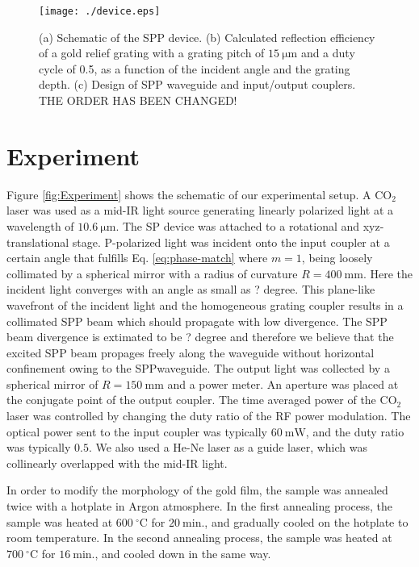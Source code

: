\documentclass[twocolumn,10.5pt,a4]{article}
\begin{document}
 \begin{figure}[!htbp]
   \begin{center}
    \texttt{[image: ./device.eps]}
    \caption{(a) Schematic of the SPP device. (b) Calculated reflection efficiency of a gold relief grating with a grating pitch of $15\:\mathrm{\mu m}$ and a duty cycle of 0.5, as a function of the incident angle and the grating depth. (c) Design of SPP waveguide and input/output couplers. THE ORDER HAS BEEN CHANGED!}
     \label{fig:Device}
   \end{center}
\end{figure}

\section{Experiment}
\label{sec:experiment}
Figure \ref{fig:Experiment} shows the schematic of our experimental setup. 
A $\mathrm{CO_2}$ laser was used as a mid-IR light source generating linearly polarized light at a wavelength of $10.6 \:\mathrm{\mu m}$. 
The SP device was attached to a rotational and xyz-translational stage. 
P-polarized light was incident onto the input coupler at a certain angle that fulfills Eq. \ref{eq:phase-match} where $m=1$, being loosely collimated by a spherical mirror with a radius of curvature $R=400\:\mathrm{mm}$. 
Here the incident light converges with an angle as small as ? degree. This plane-like wavefront of the incident light and the homogeneous grating coupler results in a collimated SPP beam which should propagate with low divergence. The SPP beam divergence is extimated to be ? degree and therefore we believe that the excited SPP beam propages freely along the waveguide without horizontal confinement owing to the SPPwaveguide.
The output light was collected by a spherical mirror of $R=150\:\mathrm{mm}$ and a power meter. 
An aperture was placed at the conjugate point of the output coupler. 
The time averaged power of the $\mathrm{CO_2}$ laser was controlled by changing the duty ratio of the RF power modulation.
The optical power sent to the input coupler was typically $60\:\mathrm{mW}$, and the duty ratio was typically $0.5$.
We also used a He-Ne laser as a guide laser, which was collinearly overlapped with the mid-IR light. 

In order to modify the morphology of the gold film, the sample was annealed twice with a hotplate in Argon atmosphere\cite{Nogues}.
In the first annealing process, the sample was heated at $600\:^\circ\mathrm{C}$ for $20\:\mathrm{min}$., and gradually cooled on the hotplate to room temperature. In the second annealing process, the sample was heated at $700\:^\circ\mathrm{C}$ for $16\:\mathrm{min}$., and cooled down in the same way.
\end{document}
